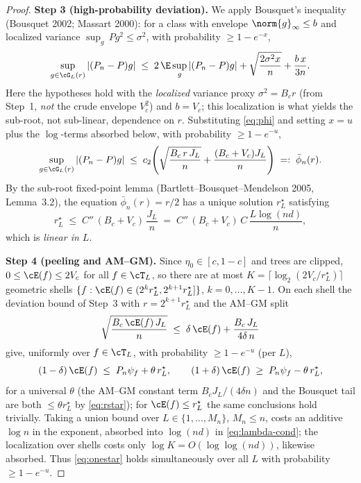 \begin{proof}
\smallskip\noindent\textbf{Step 3 (high-probability deviation).} We apply
Bousquet's inequality (Bousquet 2002; Massart 2000): for a class with envelope
$\norm{g}_\infty \le b$ and localized variance
$\sup_{g}\, Pg^2 \le \sigma^2$, with probability $\ge 1 - e^{-x}$,
\[
  \sup_{g \in \cG_L(r)} |(P_n - P)g|
  \;\le\; 2\,\E\sup_{g}|(P_n-P)g|
     + \sqrt{\frac{2\sigma^2 x}{n}} + \frac{b\,x}{3n}.
\]
Here the hypotheses hold with the \emph{localized} variance proxy
$\sigma^2 = B_c r$ (from Step~1, \emph{not} the crude envelope $V_c^2$) and
$b = V_c$; this localization is what yields the sub-root, not sub-linear,
dependence on $r$. Substituting \eqref{eq:phi} and setting $x = u$ plus the
$\log$-terms absorbed below, with probability $\ge 1 - e^{-u}$,
\[
  \sup_{g \in \cG_L(r)} |(P_n - P)g|
  \;\le\; c_2\!\left( \sqrt{\frac{B_c\, r\, J_L}{n}}
       + \frac{(B_c + V_c) J_L}{n} \right)
  \;=:\; \bar\phi_n(r).
\]
By the sub-root fixed-point lemma (Bartlett--Bousquet--Mendelson 2005,
Lemma~3.2), the equation $\bar\phi_n(r) = r/2$ has a unique solution $r^\star_L$
satisfying
\begin{equation}\label{eq:rstar}
  r^\star_L \;\le\; C''\,(B_c + V_c)\,\frac{J_L}{n}
  \;=\; C''\,(B_c + V_c)\, C\,\frac{L \log(nd)}{n},
\end{equation}
which is \emph{linear in $L$}.

\smallskip\noindent\textbf{Step 4 (peeling and AM--GM).} Since $\eta_0 \in
[c,1-c]$ and trees are clipped, $0 \le \cE(f) \le 2V_c$ for all $f \in \cT_L$,
so there are at most $K = \lceil \log_2(2V_c / r^\star_L) \rceil$ geometric
shells $\{f : \cE(f) \in (2^k r^\star_L, 2^{k+1} r^\star_L]\}$,
$k = 0, \dots, K-1$. On each shell the deviation bound of Step~3 with
$r = 2^{k+1} r^\star_L$ and the AM--GM split
\[
  \sqrt{\frac{B_c\, \cE(f)\, J_L}{n}}
  \;\le\; \delta\, \cE(f) + \frac{B_c\, J_L}{4\delta\, n}
\]
give, uniformly over $f \in \cT_L$, with probability $\ge 1 - e^{-u}$ (per $L$),
\begin{equation}\label{eq:onestar}
  (1-\delta)\,\cE(f) \;\le\; P_n\psi_f + \theta\, r^\star_L,
  \qquad
  (1+\delta)\,\cE(f) \;\ge\; P_n\psi_f - \theta\, r^\star_L,
\end{equation}
for a universal $\theta$ (the AM--GM constant term $B_c J_L/(4\delta n)$ and the
Bousquet tail are both $\le \theta r^\star_L$ by \eqref{eq:rstar}); for
$\cE(f) \le r^\star_L$ the same conclusions hold trivially. Taking a union bound
over $L \in \{1,\dots,M_n\}$, $M_n \le n$, costs an additive $\log n$ in the
exponent, absorbed into $\log(nd)$ in \eqref{eq:lambda-cond}; the localization
over shells costs only $\log K = O(\log\log(nd))$, likewise absorbed. Thus
\eqref{eq:onestar} holds simultaneously over all $L$ with probability
$\ge 1 - e^{-u}$.


\end{proof}
